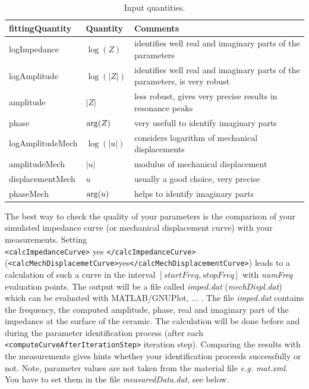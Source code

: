 \begin{table}
\begin{center}
\begin{tabular}{|p{4cm}|p{4cm}|p{6cm}|}
\hline \hline {\bf fittingQuantity} & {\bf Quantity } & {\bf Comments}\\ \hline
logImpedance & $\log(Z)$ & identifies well real and imaginary parts of the parameters \\ \hline
logAmplitude & $\log(|Z|)$ & identifies well real and imaginary parts of the parameters, is very robust \\ \hline
amplitude & $|Z|$ & less robust, gives very precise results in resonance peaks \\ \hline
phase & ${\rm arg}(Z)$ & very usefull to identify imaginary parts \\ \hline \hline
logAmplitudeMech & $\log(|u|)$ & considers logarithm of mechanical displacements \\ \hline
amplitudeMech & $|u|$ & modulus of mechanical displacement \\ \hline
displacementMech & $u$ & usually a good choice, very precise \\ \hline
phaseMech & ${\rm arg}(u)$ & helps to identify imaginary parts \\  \hline
\end{tabular} 
\caption{Input quantities.}
\label{TableFittingQuantity}
\end{center}
\end{table} 

The best way to check the quality of your parameters is the comparison of your simulated impedance curve (or mechanical displacement curve) with your measurements. Setting \\ \verb!<calcImpedanceCurve>! yes \verb!</calcImpedanceCurve>! \\ (\verb!<calcMechDisplacemetCurve>!yes\verb!</calcMechDisplacementCurve>!) leads to a calculation of such a curve in the interval $[startFreq,stopFreq]$ with {\em numFreq} evaluation points. The output will be a file called {\em imped.dat} ({\em mechDispl.dat}) which can be evaluated with MATLAB/GNUPlot, ... . The file {\em imped.dat} contains the frequency, the computed amplitude, phase, real and imaginary part of the impedance at the surface of the ceramic.  The calculation will be done before and during the parameter identification process (after each  \verb!<computeCurveAfterIterationStep>! iteration step). Comparing the results with the measurements gives hints whether your identification proceeds successfully or not.  Note, parameter values are not taken from the material file {\em e.g. mat.xml}. You have to set them in the file {\em measuredData.dat}, see below.
\\ 

